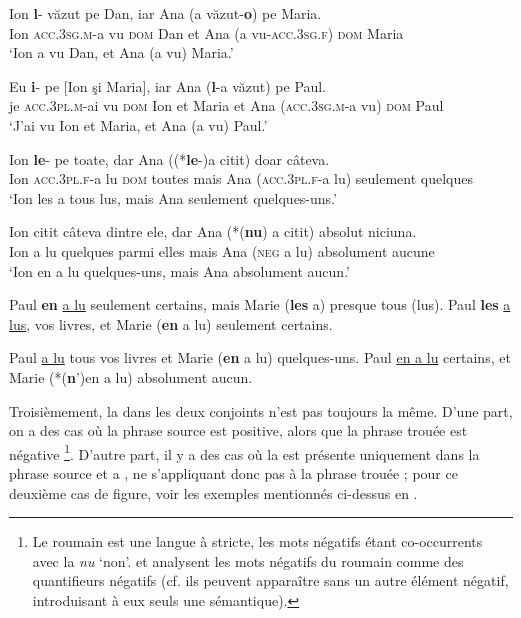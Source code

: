 \ea
\ea 
\gll Ion \textbf{l}-  văzut  pe  Dan,  iar  Ana  (a  văzut-\textbf{o})  pe  Maria. \label{ch2:ex105a}\\
Ion \textsc{acc.3sg.m-}a  vu  \textsc{dom} Dan  et  Ana  (a  vu-\textsc{acc.3sg.f}) \textsc{dom}  Maria\\
\glt ‘Ion a vu Dan, et Ana (a vu) Maria.’

\ex  
\gll Eu  \textbf{i}-    pe  [Ion  şi  Maria],  iar  Ana  (\textbf{l}-a  văzut)  pe  Paul. \label{ch2:ex105b}\\ 
je  \textsc{acc.3pl.m}-ai  vu  \textsc{dom} Ion  et  Maria  et  Ana  (\textsc{acc.3sg.m}-a  vu)  \textsc{dom}  Paul\\
\glt ‘J’ai vu Ion et Maria, et Ana (a vu) Paul.’
\z
\z

\ea
\ea  
\gll Ion  \textbf{le}-    pe  toate,  dar  Ana  ((*\textbf{le}-)a  citit)  doar  câteva. \label{ch2:ex106a}\\ 
Ion  \textsc{acc.3pl.f}-a  lu  \textsc{dom} toutes  mais  Ana  (\textsc{acc.3pl.f}-a  lu)  seulement  quelques\\
\glt ‘Ion les a tous lus, mais Ana seulement quelques-uns.’

\ex  
\gll Ion    citit  câteva  dintre  ele,  dar  Ana  (*(\textbf{nu})  a  citit)  absolut  niciuna. \label{ch2:ex106b}\\
Ion  a  lu  quelques  parmi  elles  mais  Ana  (\textsc{neg} a  lu)  absolument  aucune\\
\glt ‘Ion en a lu quelques-uns, mais Ana absolument aucun.’ 
\z
\z

\ea \label{ch2:ex107}
\ea Paul \textbf{en} \uline{a lu} seulement certains, mais Marie (\textbf{les} a) presque tous (lus).   \ex Paul \textbf{les} \uline{a lus}, vos livres, et Marie (\textbf{en} a lu) seulement certains.   
\z
\z

\ea
\ea Paul \uline{a lu} tous vos livres et Marie (\textbf{en} a lu) quelques-uns. \label{ch2:ex108a}      
\ex Paul \uline{en a lu} certains, et Marie (*(\textbf{n}’)en a lu) absolument aucun. \label{ch2:ex108b}
\z
\z

Troisièmement, la  dans les deux conjoints n’est pas toujours la même. D’une part, on a des cas où la phrase source est positive, alors que la phrase trouée est négative \footnote{
 Le roumain est une langue à  stricte, les mots négatifs étant co-occurrents avec la  \textit{nu} ‘non’. \citet{Falaus2008} et \citet{Iordachioaia2010} analysent les mots négatifs du roumain comme des quantifieurs négatifs (cf. ils peuvent apparaître sans un autre élément négatif, introduisant à eux seuls une  sémantique).}. D’autre part, il y a des cas où la  est présente uniquement dans la phrase source et a , ne s’appliquant donc pas à la phrase trouée ; pour ce deuxième cas de figure, voir les exemples mentionnés ci-dessus en .


